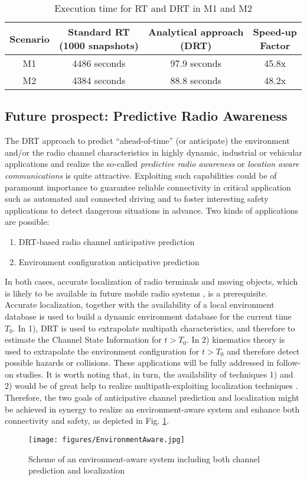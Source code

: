 \begin{table} [h!]
    \caption{Execution time for RT and DRT in M1 and M2}
    \label{time_gain}
    \centering
    \begin{tabular}{c|c|c|c}
         Scenario&\makecell{Standard RT\\(1000 snapshots)} &\makecell{Analytical approach\\(DRT)} &\makecell{Speed-up\\Factor} \\
         \hline
      M1 &4486 seconds &97.9 seconds  & 45.8x \\
      \hline
      M2 &4384 seconds &88.8 seconds  & 48.2x\\
      \hline
    \end{tabular}
\end{table}

\subsection{Future prospect: Predictive Radio Awareness}
The  DRT approach to predict “ahead-of-time” (or anticipate) the environment and/or the radio channel characteristics in highly dynamic, industrial or vehicular applications and realize the so-called \emph{predictive radio awareness} or \emph{location aware communications} \cite{Kuerner2018,DiTaranto2014} is quite attractive. Exploiting such capabilities could be of paramount importance to guarantee reliable connectivity in critical application such as automated and connected driving and to foster interesting safety applications to detect dangerous situations in advance. Two kinds of applications are possible: 
\begin{enumerate}
    \item DRT-based radio channel anticipative prediction
    \item Environment configuration anticipative prediction
\end{enumerate}
In both cases, accurate localization of radio terminals and moving objects, which is likely to be available in future mobile radio systems \cite{Witrisal2016,Koivisto2017}, is a prerequisite. Accurate localization, together with the availability of a local environment database is used to build a dynamic environment database for the current time $T_0$.
In 1), DRT is used to extrapolate multipath characteristics, and therefore to estimate the Channel State Information for $t>T_0$. In 2) kinematics theory is used to extrapolate the environment configuration for $t>T_0$ and therefore detect possible hazards or collisions.  These applications will be fully addressed in follow-on studies.
It is worth noting that, in turn, the availability of techniques 1) and 2)  would be of great help to realize multipath-exploiting localization techniques  \cite{Thomae2018}. Therefore, the two goals of anticipative channel prediction and localization might be achieved in synergy to realize an environment-aware system and enhance both connectivity and safety, as depicted in Fig. \ref{scheme_prediction}.

\begin{figure}[h!]
    \centering
    \texttt{[image: figures/EnvironmentAware.jpg]}
    \caption{Scheme of an environment-aware system including both channel prediction and localization}
    \label{scheme_prediction}
\end{figure}

